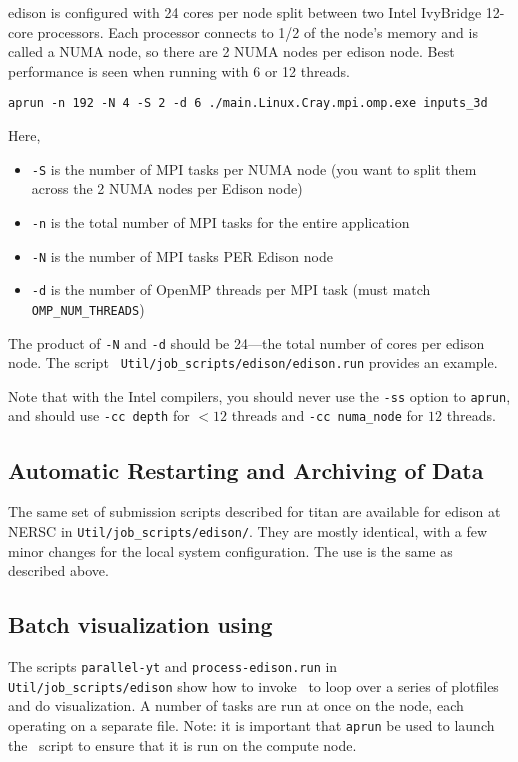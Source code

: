 edison is configured with 24 cores per node split between two Intel
IvyBridge 12-core processors.  Each processor connects to 1/2 of the
node's memory and is called a NUMA node, so there are 2 NUMA nodes per
edison node.  Best performance is seen when running with 6 or 12 threads.
\begin{verbatim}
aprun -n 192 -N 4 -S 2 -d 6 ./main.Linux.Cray.mpi.omp.exe inputs_3d
\end{verbatim}
Here,
\begin{itemize}
\item {\tt -S} is the number of MPI tasks per NUMA node (you want to split them
  across the 2 NUMA nodes per Edison node)
\item {\tt -n} is the total number of MPI tasks for the entire application
\item {\tt -N} is the number of MPI tasks PER Edison node
\item {\tt -d} is the number of OpenMP threads per MPI task (must match 
{\tt OMP\_NUM\_THREADS})
\end{itemize}
The product of {\tt -N} and {\tt -d} should be 24---the total number of cores
per edison node.
The script {\tt
Util/job\_scripts/edison/edison.run} provides an example.

Note that with the Intel compilers, you should never use the {\tt -ss}
option to {\tt aprun}, and should use {\tt -cc depth} for $< 12$
threads and {\tt -cc numa\_node} for $12$ threads.



\subsection{Automatic Restarting and Archiving of Data}

The same set of submission scripts described for titan are available
for edison at NERSC in {\tt Util/job\_scripts/edison/}.  They are
mostly identical, with a few minor changes for the local system
configuration.  The use is the same as described above.

\subsection{Batch visualization using \yt}

The scripts {\tt parallel-yt} and {\tt process-edison.run} in {\tt
Util/job\_scripts/edison} show how to invoke \yt\ to loop over a 
series of plotfiles and do visualization.  A number of tasks are
run at once on the node, each operating on a separate file.  Note:
it is important that {\tt aprun} be used to launch the \yt\ script
to ensure that it is run on the compute node.


